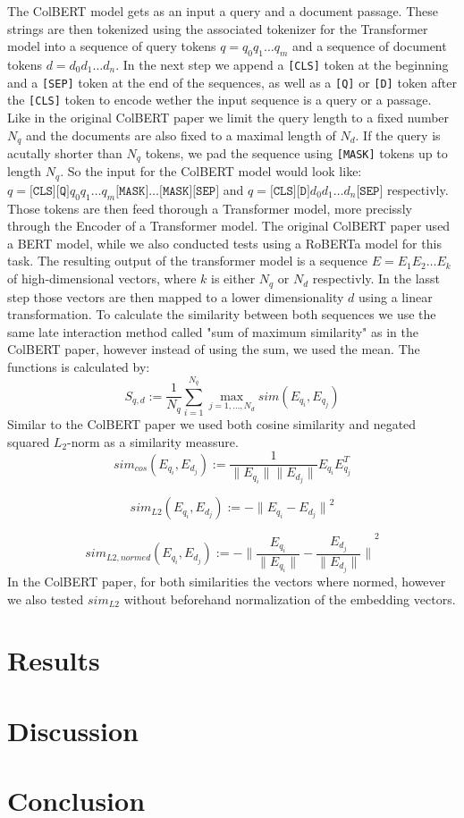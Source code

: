 \documentclass{article}
\begin{document}
The ColBERT model gets as an input a query and a document passage. These strings are then tokenized using the associated tokenizer for the Transformer model into a sequence of query tokens $q = q_0q_1\dots q_m$ and a sequence of document tokens $d = d_0d_1\dots d_n$.  In the next step we append a \texttt{[CLS]} token at the beginning and a \texttt{[SEP]} token at the end of the sequences, as well as a \texttt{[Q]} or \texttt{[D]} token after the \texttt{[CLS]} token to encode wether the input sequence is a query or a passage. Like in the original ColBERT paper we limit the query length to a fixed number $N_q$ and the documents are also fixed to a maximal length of $N_d$. If the query is acutally shorter than $N_q$ tokens, we pad the sequence using \texttt{[MASK]} tokens up to length $N_q$. So the input for the ColBERT model would look like: $q = \texttt{[CLS]}\texttt{[Q]}q_0q_1 \dots q_m\texttt{[MASK]}\dots\texttt{[MASK]}\texttt{[SEP]}$ and $q = \texttt{[CLS]}\texttt{[D]}d_0d_1 \dots d_n\texttt{[SEP]}$ respectivly. Those tokens are then feed thorough a Transformer model, more precissly through the Encoder of a Transformer model. The original ColBERT paper used a BERT model, while we also conducted tests using a RoBERTa model for this task. The resulting output of the transformer model is a sequence $E = E_1E_2 \dots E_k$ of high-dimensional vectors, where $k$ is either $N_q$ or $N_d$ respectivly. In the lasst step those vectors are then mapped to a lower dimensionality $d$ using a linear transformation. To calculate the similarity between both sequences we use the same late interaction method called "sum of maximum similarity" as in the ColBERT paper, however instead of using the sum, we used the mean. The functions is calculated by:
$$ S_{q,d} := \frac{1}{N_q} \sum_{i=1}^{N_q} \max_{j = 1, \dots, N_d} sim(E_{q_i}, E_{q_j})
$$
Similar to the ColBERT paper we used both cosine similarity and negated squared $L_2$-norm as a similarity meassure. 
$$
sim_{cos}(E_{q_i}, E_{d_j}) := \frac{1}{\| E_{q_i} \|\| E_{d_j} \|} E_{q_i}E_{q_j}^T $$

$$
sim_{L2}(E_{q_i}, E_{d_j}) := -{\| E_{q_i} -E_{d_j} \|}^2
$$

$$
sim_{L2,normed}(E_{q_i}, E_{d_j}) := -{\| \frac{E_{q_i}}{\| E_{q_i} \|}  - \frac{E_{d_j}}{\| E_{d_j} \|} \|}^2
$$
In the ColBERT paper, for both similarities the vectors where normed, however we also tested $sim_{L2}$ without beforehand normalization of the embedding vectors.



\section{Results}

\section{Discussion}

\section{Conclusion}

%
%
\end{document}
